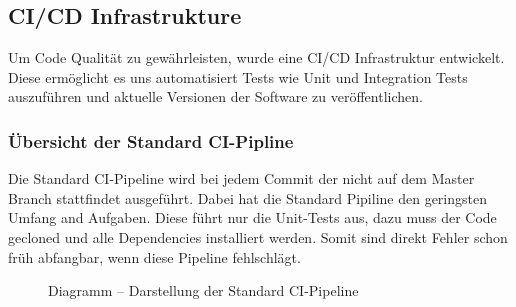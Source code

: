 \subsection{CI/CD Infrastrukture}
Um Code Qualität zu gewährleisten, wurde eine \ac{CI/CD} Infrastruktur entwickelt. Diese ermöglicht es uns automatisiert Tests wie Unit und Integration Tests
auszuführen und aktuelle Versionen der Software zu veröffentlichen.

\subsubsection{Übersicht der Standard \ac{CI}-Pipline}
Die Standard \ac{CI}-Pipeline wird bei jedem Commit der nicht auf dem Master Branch stattfindet ausgeführt. Dabei hat die Standard Pipiline den geringsten Umfang and Aufgaben.
Diese führt nur die Unit-Tests aus, dazu muss der Code gecloned und alle Dependencies installiert werden. Somit sind direkt Fehler schon früh abfangbar, wenn diese Pipeline fehlschlägt.
\begin{figure}[!htbp]
    \centering    
    \usetikzlibrary{positioning}
\caption{Diagramm – Darstellung der Standard \ac{CI}-Pipeline}
\end{figure}

